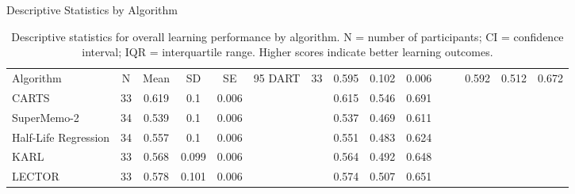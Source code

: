 \begin{table}[htbp]
\centering
\caption{Descriptive Statistics by Algorithm}
\begin{tabular}{lccccccccc}
\toprule
Algorithm & N & Mean & SD & SE & 95%
\midrule
DART & 33 & 0.595 & 0.102 & 0.006 &  &  & 0.592 & 0.512 & 0.672 \\
CARTS & 33 & 0.619 & 0.1 & 0.006 &  &  & 0.615 & 0.546 & 0.691 \\
SuperMemo-2 & 34 & 0.539 & 0.1 & 0.006 &  &  & 0.537 & 0.469 & 0.611 \\
Half-Life Regression & 34 & 0.557 & 0.1 & 0.006 &  &  & 0.551 & 0.483 & 0.624 \\
KARL & 33 & 0.568 & 0.099 & 0.006 &  &  & 0.564 & 0.492 & 0.648 \\
LECTOR & 33 & 0.578 & 0.101 & 0.006 &  &  & 0.574 & 0.507 & 0.651 \\
\bottomrule
\end{tabular}
\label{tab:descriptive-statistics-by-algorithm}
\caption*{Descriptive statistics for overall learning performance by algorithm. N = number of participants; CI = confidence interval; IQR = interquartile range. Higher scores indicate better learning outcomes.}
\end{table}